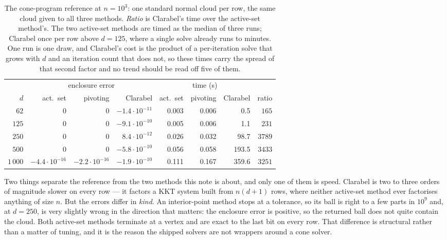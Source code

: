 \documentclass[10pt,a4paper]{article}
\theoremstyle{plain}
\begin{document}
\begin{table}[h]
\centering
\small
\setlength{\tabcolsep}{5pt}
\begin{tabular}{r rrr rrr r}
  \toprule
  & \multicolumn{3}{c}{enclosure error} & \multicolumn{3}{c}{time (s)} & \\
  \cmidrule(lr){2-4}\cmidrule(lr){5-7}
  $d$ & act.\ set & pivoting & Clarabel
      & act.\ set & pivoting & Clarabel & ratio \\
  \midrule
  $62$ & $0$ & $0$ & $-1.4\cdot10^{-11}$ & 0.003 & 0.006 & 0.5 & $165$ \\
  $125$ & $0$ & $0$ & $-9.1\cdot10^{-10}$ & 0.005 & 0.006 & 1.1 & $231$ \\
  $250$ & $0$ & $0$ & $8.4\cdot10^{-12}$ & 0.026 & 0.032 & 98.7 & $3789$ \\
  $500$ & $0$ & $0$ & $-5.8\cdot10^{-10}$ & 0.056 & 0.058 & 193.5 & $3433$ \\
  $1\,000$ & $-4.4\cdot10^{-16}$ & $-2.2\cdot10^{-16}$ & $-1.9\cdot10^{-10}$ & 0.111 & 0.167 & 359.6 & $3251$ \\
  \bottomrule
\end{tabular}
\caption{The cone-program reference at $n=10^3$: one standard normal cloud per
row, the same cloud given to all three methods. \emph{Ratio} is Clarabel's time
over the active-set method's. The two active-set methods are timed as the median
of three runs; Clarabel once per row above $d=125$, where a single solve already
runs to minutes. One run is one draw, and Clarabel's cost is the product of a
per-iteration solve that grows with $d$ and an iteration count that does not, so
these times carry the spread of that second factor and no trend should be read
off five of them.}
\label{tab:reference}
\end{table}

Two things separate the reference from the two methods this note is about, and
only one of them is speed. Clarabel is two to three orders of magnitude slower on
every row --- it factors a KKT system built from $n(d+1)$ rows, where neither
active-set method ever factorises anything of size $n$. But the errors differ in
\emph{kind}. An interior-point method stops at a tolerance, so its ball is right
to a few parts in $10^{9}$ and, at $d=250$, is very slightly wrong in the
direction that matters: the enclosure error is positive, so the returned ball does
not quite contain the cloud. Both active-set methods terminate at a vertex and are
exact to the last bit on every row. That difference is structural rather than a
matter of tuning, and it is the reason the shipped solvers are not wrappers around
a cone solver.
\end{document}
